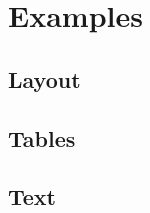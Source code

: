 \section{Examples}

\subsection{Layout}
\frameready{
  
}

\subsection{Tables}
\frameready{
  
}

\subsection{Text}
\frameready{
	
	
	
}